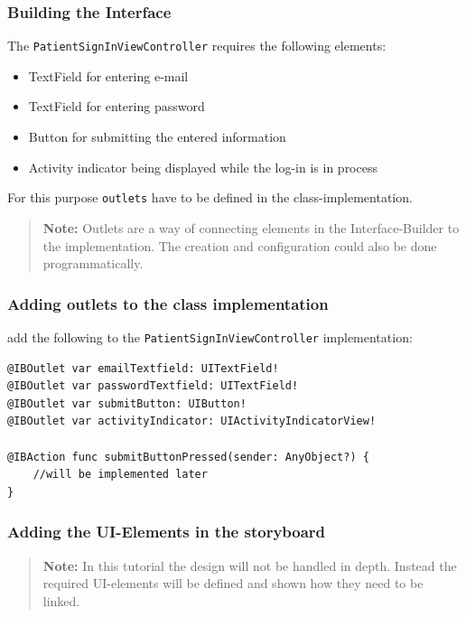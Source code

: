 \documentclass{article}
\begin{document}
\subsubsection{Building the Interface}\label{step5:building-the-interface}



The \texttt{PatientSignInViewController} requires the following
elements:
\begin{itemize}
  \item
    TextField for entering e-mail
  \item
    TextField for entering password
  \item
    Button for submitting the entered information
  \item
    Activity indicator being displayed while the log-in is in process
\end{itemize}

For this purpose \texttt{outlets} have to be defined in the class-implementation.
\begin{quote}
\textbf{Note:} Outlets are a way of
connecting elements in the Interface-Builder to the implementation. The
creation and configuration could also be done programmatically.
\end{quote}

\subsubsection{Adding outlets to the class implementation}\label{step5:add-the-outlets-to-the-class}

add the following to the \texttt{PatientSignInViewController}
implementation:

\begin{verbatim}
@IBOutlet var emailTextfield: UITextField!
@IBOutlet var passwordTextfield: UITextField!
@IBOutlet var submitButton: UIButton!
@IBOutlet var activityIndicator: UIActivityIndicatorView!

@IBAction func submitButtonPressed(sender: AnyObject?) {
    //will be implemented later
}
\end{verbatim}

\subsubsection{Adding the UI-Elements in the storyboard}\label{step5:in-the-storyboard-add-the-elements}
\begin{quote}
\textbf{Note:} In this tutorial the design will not be handled in depth. Instead
the required UI-elements will be defined and shown how they need to be
linked.
\end{quote}
\end{document}
